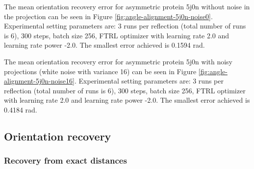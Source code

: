 The mean orientation recovery error for asymmetric protein 5j0n without noise in the projection can be seen in Figure \ref{fig:angle-alignment-5j0n-noise0}. Experimental setting parameters are: 3 runs per reflection (total number of runs is 6), 300 steps, batch size 256, FTRL optimizer with learning rate 2.0 and learning rate power -2.0. The smallest error achieved is 0.1594 rad.

The mean orientation recovery error for asymmetric protein 5j0n with noisy projections (white noise with variance 16) can be seen in Figure \ref{fig:angle-alignment-5j0n-noise16}. Experimental setting parameters are: 3 runs per reflection (total number of runs is 6), 300 steps, batch size 256, FTRL optimizer with learning rate 2.0 and learning rate power -2.0. The smallest error achieved is 0.4184 rad.



\subsection{Orientation recovery}\label{sec:results:orientation-recovery}


\subsubsection{Recovery from exact distances}\label{sec:results:orientation-recovery:exact}


